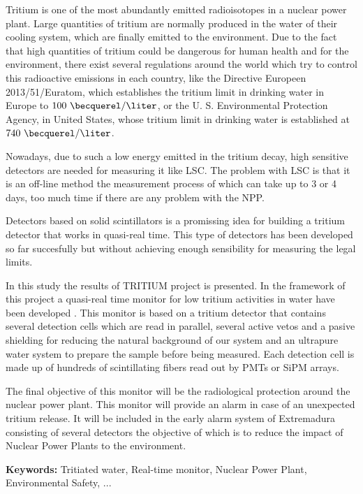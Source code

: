 Tritium is one of the most abundantly emitted radioisotopes in a nuclear power plant. Large quantities of tritium are normally produced in the water of their cooling system, which are finally emitted to the environment. Due to the fact that high quantities of tritium could be dangerous for human health and for the environment, there exist several regulations around the world which try to control this radioactive emissions in each country, like the Directive Europeen 2013/51/Euratom, which establishes the tritium limit in drinking water in Europe to $100~\becquerel/\liter$, or the U. S. Environmental Protection Agency, in United States, whose tritium limit in drinking water is established at $740~\becquerel/\liter$.

Nowadays, due to such a low energy emitted in the tritium decay, high sensitive detectors are needed for measuring it like LSC. The problem with LSC is that it is an off-line method the measurement process of which can take up to 3 or 4 days, too much time if there are any problem with the NPP.

Detectors based on solid scintillators is a promissing idea for building a tritium detector that works in quasi-real time. This type of detectors has been developed so far succesfully but without achieving enough sensibility for measuring the legal limits.

In this study the results of TRITIUM project is presented. In the framework of this project a quasi-real time monitor for low tritium activities in water have been developed . This monitor is based on a tritium detector that contains several detection cells which are read in parallel, several active vetos and a pasive shielding for reducing the natural background of our system and an ultrapure water system to prepare the sample before being measured. Each detection cell is made up of hundreds of scintillating fibers read out by PMTs or SiPM arrays.

The final objective of this monitor will be the radiological protection around the nuclear power plant. This monitor will provide an alarm in case of an unexpected tritium release. It will be included in the early alarm system of Extremadura consisting of several detectors the objective of which is to reduce the impact of Nuclear Power Plants to the environment.

\vspace{1cm}

\textbf{Keywords:} Tritiated water, Real-time monitor, Nuclear Power Plant, Environmental Safety, ...